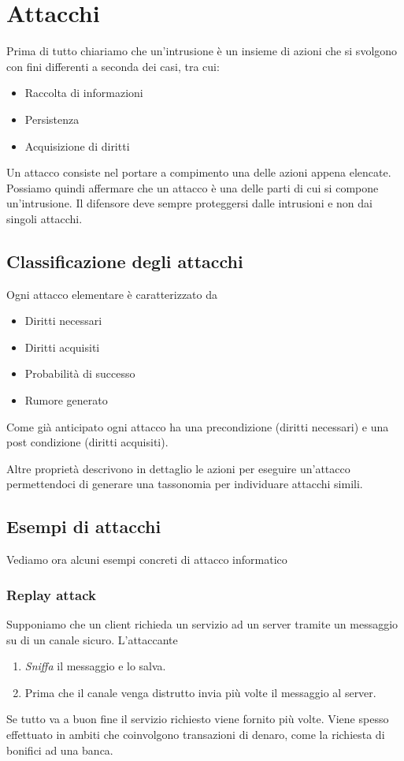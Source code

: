 \chapter{Attacchi}
Prima di tutto chiariamo che un'intrusione è un insieme di azioni che si svolgono con fini differenti a seconda dei
casi, tra cui:
\begin{itemize}
	\item Raccolta di informazioni
	\item Persistenza
	\item Acquisizione di diritti
\end{itemize}
Un attacco consiste nel portare a compimento una delle azioni appena elencate. Possiamo quindi affermare che un
attacco è una delle parti di cui si compone un'intrusione. Il difensore deve sempre proteggersi dalle intrusioni e
non dai singoli attacchi.

\section{Classificazione degli attacchi}
Ogni attacco elementare è caratterizzato da
\begin{itemize}
	\item Diritti necessari
	\item Diritti acquisiti
	\item Probabilità di successo
	\item Rumore generato
\end{itemize}
Come già anticipato ogni attacco ha una precondizione (diritti necessari) e una post condizione (diritti acquisiti).

Altre proprietà descrivono in dettaglio le azioni per eseguire un'attacco permettendoci di generare una tassonomia
per individuare attacchi simili.

\section{Esempi di attacchi}
Vediamo ora alcuni esempi concreti di attacco informatico

\subsection{Replay attack}
Supponiamo che un client richieda un servizio ad un server tramite un messaggio su di un canale sicuro. L'attaccante
\begin{enumerate}
	\item \emph{Sniffa} il messaggio e lo salva.
	\item Prima che il canale venga distrutto invia più volte il messaggio al server.
\end{enumerate}
Se tutto va a buon fine il servizio richiesto viene fornito più volte. Viene spesso effettuato in ambiti che
coinvolgono transazioni di denaro, come la richiesta di bonifici ad una banca.

